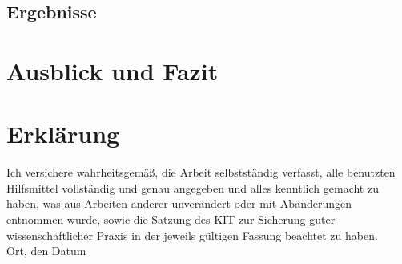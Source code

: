 \documentclass[12pt,a4paper]{scrartcl}
\numberwithin{equation}{section}
\begin{document}
\subsection{Ergebnisse}
\section{Ausblick und Fazit}

  \newpage

  
  
 
      

\newpage
  
 \thispagestyle{empty}


\vspace*{8cm}


\section*{Erkl\"arung}

Ich  versichere  wahrheitsgem\"a\ss,  die  Arbeit selbstst\"andig verfasst,  alle  benutzten  Hilfsmittel  vollst\"andig  und  genau  angegeben  und  alles kenntlich  gemacht  zu  haben,  was  aus  Arbeiten  anderer  unver\"andert  oder  mit  Ab\"anderungen entnommen  wurde,  sowie die Satzung  des  KIT  zur  Sicherung guter wissenschaftlicher Praxis in der jeweils g\"ultigen Fassung beachtet zu haben.
\\[2ex] 

\noindent
Ort, den Datum\\[5ex]

\end{document}
